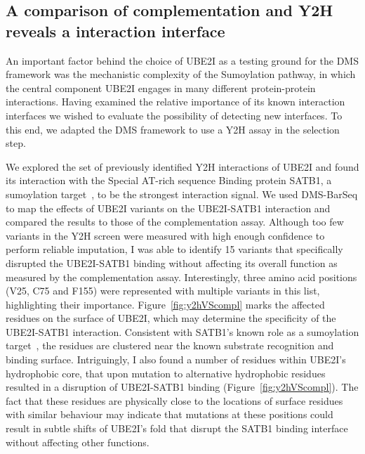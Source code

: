 \subsection{A comparison of complementation and Y2H reveals a interaction interface}

An important factor behind the choice of UBE2I as a testing ground for the DMS framework was the mechanistic complexity of the Sumoylation pathway, in which the central component UBE2I engages in many different protein-protein interactions. Having examined the relative importance of its known interaction interfaces we wished to evaluate the possibility of detecting new interfaces. To this end, we adapted the DMS framework to use a Y2H assay in the selection step.


We explored the set of previously identified Y2H interactions of UBE2I and found its interaction with the Special AT-rich sequence Binding protein SATB1, a sumoylation target~\cite{tan_sumo_2008}, to be the strongest interaction signal. We used DMS-BarSeq to map the effects of UBE2I variants on the UBE2I-SATB1 interaction and compared the results to those of the complementation assay. Although too few variants in the Y2H screen were measured with high enough confidence to perform reliable imputation, I was able to identify 15 variants that specifically disrupted the UBE2I-SATB1 binding without affecting its overall function as measured by the complementation assay. Interestingly, three amino acid positions (V25, C75 and F155) were represented with multiple variants in this list, highlighting their importance. Figure~\ref{fig:y2hVScompl} marks the affected residues on the surface of UBE2I, which may determine the specificity of the UBE2I-SATB1 interaction. Consistent with SATB1's known role as a sumoylation target~\cite{tan_sumo_2008}, the residues are clustered near the known substrate recognition and binding surface. Intriguingly, I also found a number of residues within UBE2I's hydrophobic core, that upon mutation to alternative hydrophobic residues resulted in a disruption of UBE2I-SATB1 binding (Figure~\ref{fig:y2hVScompl}). The fact that these residues are physically close to the locations of surface residues with similar behaviour may indicate that mutations at these positions could result in subtle shifts of UBE2I's fold that disrupt the SATB1 binding interface without affecting other functions.

